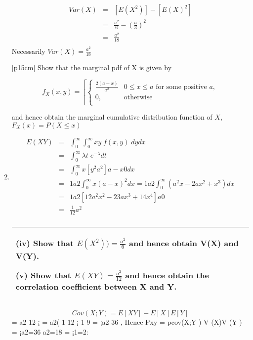 \documentclass[a4paper,12pt]{article}
\begin{document}
\begin{enumerate}
\begin{eqnarray*}
Var(X) &=& [E(X^2)] - [E(X)^2] \\
      &=& \frac{a^2}{6} - \left(\frac{a}{3}\right)^2 \\
     &=& \frac{a^2}{18} \\
\end{eqnarray*}
Necessarily $Var(X) = \frac{a^2}{18}$


\newpage
  \begin{table}[ht!]
     \centering
     \begin{tabular}{|p{15cm}|}
     \hline
  Show that the marginal pdf of X is given by 



\[  f_X(x,y) = \left[ \begin{cases}  
\frac{2(a-x)}{a^2} &  0 \leq x  \leq a \mbox{ for some positive } a,    \\
0,  & \mbox{otherwise} \\ 
\end{cases}\]
  
 and hence obtain the marginal cumulative distribution function of $X$, $F_X(x) = P(X \leq x)$\\
\hline

      \end{tabular}
    \end{table}

\item 

\begin{eqnarray*}
E(XY) &=& \int^{\infty}_{0} \int^{\infty}_{0} xy\; f(x,y) \; dydx \\
    &=&\int^{\infty}_{0} \lambda t\;e^{-\lambda} dt \\
&=&
\int^{\infty}_{0} x[ y^2
a^2 ]a-x
0 dx \\ &=& 1
a2
\int^{\infty}_{0} x(a - x)^2dx = 1
a2
\int^{\infty}_{0}(a^2x - 2ax^2 + x^3)dx\\
&=& 1
a2 [ 1
2a^2x^2 - 2
3ax^3 + 1
4x^4]a
0\\ &=& \frac{1}{12}a^2\\
\end{eqnarray*}


  \begin{table}[ht!]
     \centering
     \begin{tabular}{|p{15cm}|}
     \hline  
 (iv) Show that $E(X^2)) = \frac{a^2}{6}$
and hence obtain V(X) and V(Y).       
 
(v) Show that $E(XY) = \frac{a^2}{12}$
and hence obtain the correlation coefficient 
between X and Y.\\ \hline
\end{tabular}
\end{table}
\[Cov(X; Y ) = E[XY ] - E[X]E[Y ]\] = a2
12 ¡  = a2( 1
12 ¡ 1
9 = ¡a2
36 ,
Hence Pxy = pcov(X;Y )
V (X)V (Y )
= ¡a2=36
a2=18 = ¡1=2:
\end{enumerate}
\end{document}
